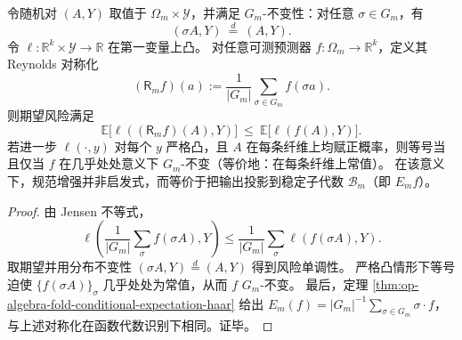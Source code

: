 \begin{proposition}\label{prop:op-algebra-fold-reynolds-risk-convex}
令随机对 \((A,Y)\) 取值于 \(\Omega_m\times\mathcal Y\)，并满足 \(G_m\)-不变性：对任意 \(\sigma\in G_m\)，有
\[
(\sigma A,Y)\ \overset{d}{=}\ (A,Y).
\]
令 \(\ell:\mathbb R^k\times\mathcal Y\to\mathbb R\) 在第一变量上凸。
对任意可测预测器 \(f:\Omega_m\to\mathbb R^k\)，定义其 Reynolds 对称化
\[
(\mathsf R_m f)(a):=\frac{1}{|G_m|}\sum_{\sigma\in G_m} f(\sigma a).
\]
则期望风险满足
\[
\mathbb E\bigl[\ell((\mathsf R_m f)(A),Y)\bigr]\ \le\ \mathbb E\bigl[\ell(f(A),Y)\bigr].
\]
若进一步 \(\ell(\cdot,y)\) 对每个 \(y\) 严格凸，且 \(A\) 在每条纤维上均赋正概率，则等号当且仅当 \(f\) 在几乎处处意义下 \(G_m\)-不变（等价地：在每条纤维上常值）。
在该意义下，规范增强并非启发式，而等价于把输出投影到稳定子代数 \(\mathcal B_m\)（即 \(E_m f\)）。
\end{proposition}

\begin{proof}
由 Jensen 不等式，
\[
\ell\!\left(\frac{1}{|G_m|}\sum_{\sigma} f(\sigma A),Y\right)
\le
\frac{1}{|G_m|}\sum_{\sigma}\ell(f(\sigma A),Y).
\]
取期望并用分布不变性 \((\sigma A,Y)\overset d=(A,Y)\) 得到风险单调性。
严格凸情形下等号迫使 \(\{f(\sigma A)\}_{\sigma}\) 几乎处处为常值，从而 \(f\) \(G_m\)-不变。
最后，定理 \ref{thm:op-algebra-fold-conditional-expectation-haar} 给出 \(E_m(f)=|G_m|^{-1}\sum_{\sigma\in G_m}\sigma\cdot f\)，与上述对称化在函数代数识别下相同。证毕。
\end{proof}
